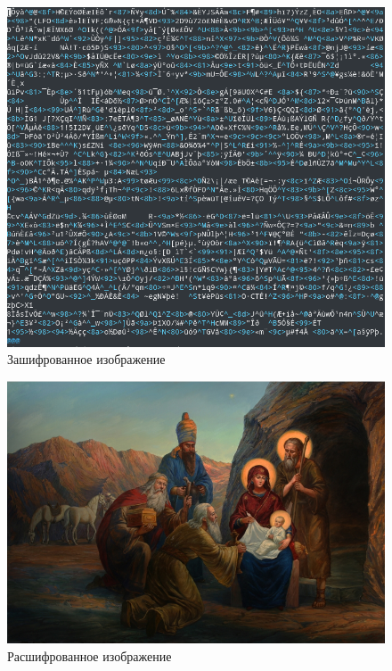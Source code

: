 \documentclass{article}
\begin{document}
\begin{figure}[H]
    \begin{flushleft} \centerline{\includegraphics[scale=0.5]{cipherimage.png}}
        \caption{Зашифрованное изображение}
    \end{flushleft}
\end{figure}

\begin{figure}[H]
    \begin{flushleft} \centerline{\includegraphics[scale=0.5]{openimage.png}}
        \caption{Расшифрованное изображение}
    \end{flushleft}
\end{figure}
\newpage
\end{document}
